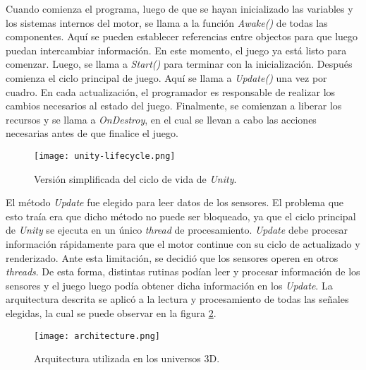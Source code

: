 Cuando comienza el programa, luego de que se hayan inicializado las variables y los sistemas internos del motor, se llama a la función \emph{Awake()} de todas las componentes. Aquí se pueden establecer referencias entre objectos para que luego puedan intercambiar información. En este momento, el juego ya está listo para comenzar. Luego, se llama a \emph{Start()} para terminar con la inicialización. Después comienza el ciclo principal de juego. Aquí se llama a \emph{Update()} una vez por cuadro. En cada actualización, el programador es responsable de realizar los cambios necesarios al estado del juego. Finalmente, se comienzan a liberar los recursos y se llama a \emph{OnDestroy}, en el cual se llevan a cabo las acciones necesarias antes de que finalice el juego.

\begin{figure}[H]
	\centering
    \texttt{[image: unity-lifecycle.png]}
    \caption{Versión simplificada del ciclo de vida de \emph{Unity}.}
	\label{fig:unity-lifecycle}
\end{figure}

El método \emph{Update} fue elegido para leer datos de los sensores. El problema que esto traía era que dicho método no puede ser bloqueado, ya que el ciclo principal de \emph{Unity} se ejecuta en un único \emph{thread} de procesamiento. \emph{Update} debe procesar información rápidamente para que el motor continue con su ciclo de actualizado y renderizado. Ante esta limitación, se decidió que los sensores operen en otros \emph{threads}. De esta forma, distintas rutinas podían leer y procesar información de los sensores y el juego luego podía obtener dicha información en los \emph{Update}. La arquitectura descrita se aplicó a la lectura y procesamiento de todas las señales elegidas, la cual se puede observar en la figura \ref{fig:architecture}.

\begin{figure}[H]
	\centering
    \texttt{[image: architecture.png]}
    \caption{Arquitectura utilizada en los universos 3D.}
	\label{fig:architecture}
\end{figure}

